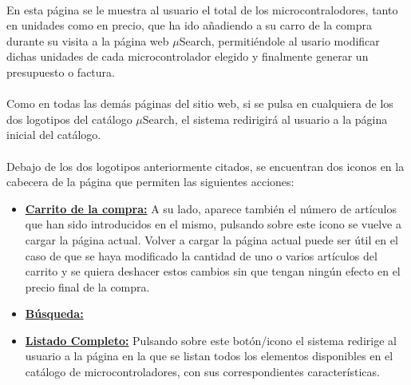 \paragraph{}En esta página se le muestra al usuario el total de los microcontralodores, tanto en unidades como en precio, que ha ido añadiendo a su carro de la compra durante su visita a la página web $\mu$Search, permitiéndole al usario modificar dichas unidades de cada microcontrolador elegido y finalmente generar un presupuesto o factura.

\paragraph{}Como en todas las demás páginas del sitio web, si se pulsa en cualquiera de los dos logotipos del catálogo $\mu$Search, el sistema redirigirá al usuario a la página inicial del catálogo.

\paragraph{}Debajo de los dos logotipos anteriormente citados, se encuentran dos iconos en la cabecera de la página que permiten las siguientes acciones:

\begin{itemize}
\item \underline{\textbf{Carrito de la compra:}} A su lado, aparece también el número de artículos que han sido introducidos en el mismo, pulsando sobre este icono se vuelve a cargar la página actual. Volver a cargar la página actual puede ser útil en el caso de que se haya modificado la cantidad de uno o varios artículos del carrito y se quiera deshacer estos cambios sin que tengan ningún efecto en el precio final de la compra.

\item \underline{\textbf{Búsqueda:}}

\item \underline{\textbf{Listado Completo:}} Pulsando sobre este botón/icono el sistema redirige al usuario a la página en la que se listan todos los elementos disponibles en el catálogo de microcontroladores, con sus correspondientes características.
\end{itemize}

